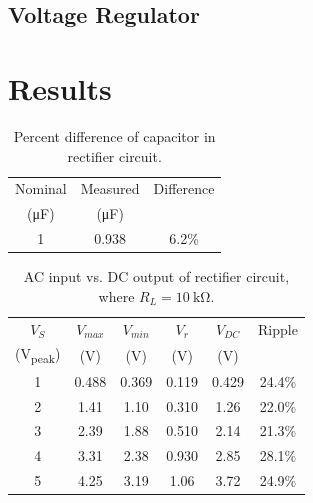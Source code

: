 \documentclass{article}
\begin{document}
\subsection{Voltage Regulator}
\label{sec:volt_reg}


\section{Results}
\label{sec:results}

\begin{table}[hbtp]
  \centering
  \begin{tabular}{ccc}
    Nominal & Measured & Difference \\
    (\si{\micro\farad}) & (\si{\micro\farad}) & \\
    \hline
    1 & 0.938 & 6.2\% \\
  \end{tabular}
  \caption{\label{tab:cap} Percent difference of capacitor in rectifier circuit.}
\end{table}

\begin{table}[hbtp]
  \centering
  \begin{tabular}{cccccc}
    $V_S$ & $V_{max}$ & $V_{min}$ & $V_r$ & $V_{DC}$ & Ripple \\
    (\si{V_{peak}}) & (\si{V}) & (\si{V}) & (\si{V}) & (\si{V}) & \\
    \hline
    1 & 0.488 & 0.369 & 0.119 & 0.429 & 24.4\% \\
    2 & 1.41 & 1.10 & 0.310 & 1.26 & 22.0\% \\
    3 & 2.39 & 1.88 & 0.510 & 2.14 & 21.3\% \\
    4 & 3.31 & 2.38 & 0.930 & 2.85 & 28.1\% \\
    5 & 4.25 & 3.19 & 1.06 & 3.72 & 24.9\% \\
  \end{tabular}
  \caption{\label{tab:rect_vp_vdc} AC input vs. DC output of rectifier circuit, where $R_L=\SI{10}{\kilo\ohm}$.}
\end{table}
\end{document}
